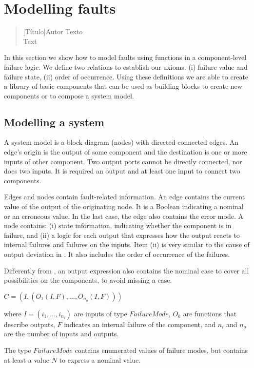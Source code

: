 \chapter{Modelling faults}
\label{sec:fault-modelling}

\begin{quotation}[Título]{Autor}
Texto \\
Text
\end{quotation}

In this section we show how to model faults using functions in a component-level failure logic.
%
We define two relations to establish our axioms: (i) failure value and failure state, (ii) order of occurrence.
%
Using these definitions we are able to create a library of basic components that can be used as building blocks to create new components or to compose a system model.

\section{Modelling a system}
\label{sec:modelling-a-system}

A system model is a block diagram (nodes) with directed connected edges. 
%
An edge's origin is the output of some component and the destination is one or more inputs of other component.
%
Two output ports cannot be directly connected, nor does two inputs.
%
It is required an output and at least one input to connect two components.

Edges and nodes contain fault-related information.
%
An edge contains the current value of the output of the originating node.
%
It is a Boolean indicating a nominal or an erroneous value. 
%
In the last case, the edge also contains the error mode.
%
A node contains: (i) state information, indicating whether the component is in failure, and (ii) a logic for each output that expresses how the output reacts to internal failures and failures on the inputs. 
%
Item (ii) is very similar to the cause of output deviation in .
%
It also includes the order of occurrence of the failures.

Differently from \HIPHOPS, an output expression also contains the nominal case to cover all possibilities on the components, to avoid missing a case.

\begin{definition}[Component]
$C = \left(I, \left( O_1\left(I,F\right),\ldots,O_{n_o}\left(I,F\right) \right) \right)$

\noindent where $I = \left(i_1,\ldots,i_{n_i}\right)$ are inputs of type $FailureMode$, $O_k$ are functions that describe outputs, $F$ indicates an internal failure of the component, and $n_i$ and $n_o$ are the number of inputs and outputs.

The type $FailureMode$ contains enumerated values of failure modes, but contains at least a value $N$ to express a nominal value.
\end{definition}

